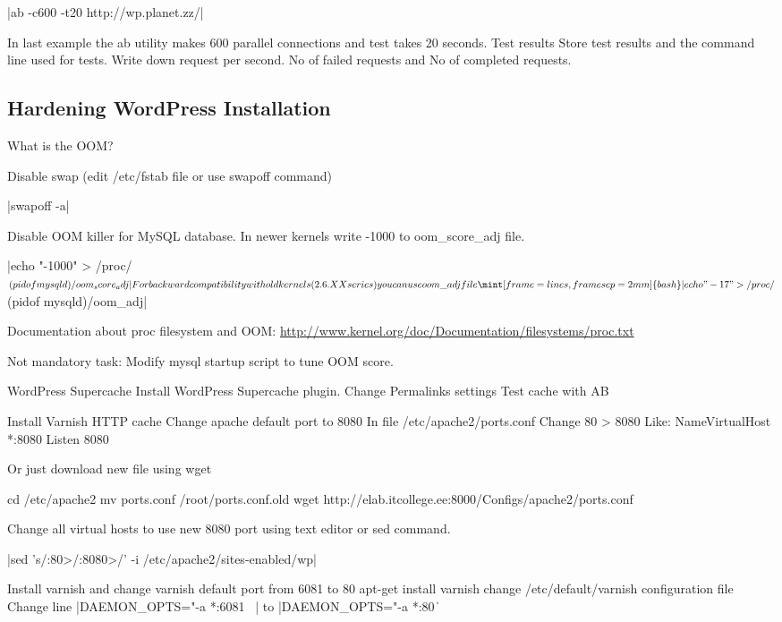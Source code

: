 |ab -c600 -t20 http://wp.planet.zz/|

In last example the ab utility makes 600 parallel connections and test takes 20 seconds.
Test results
Store test results and the command line used for tests.
Write down request per second. No of failed requests and No of completed requests.

\subsection{Hardening WordPress Installation}

What is the OOM?

Disable swap (edit /etc/fstab file or use swapoff command)


|swapoff -a|

Disable OOM killer for MySQL database. In newer kernels write -1000 to oom\_score\_adj file.

|echo "-1000" > /proc/$(pidof mysqld)/oom_score_adj|
For backward compatibility with old kernels (2.6.XX series) you can use oom\_adj file
\mint[frame=lines, framesep=2mm]{bash}|echo "-17" > /proc/$(pidof mysqld)/oom_adj|

Documentation about proc filesystem and OOM:
\url{http://www.kernel.org/doc/Documentation/filesystems/proc.txt}

Not mandatory task: Modify mysql startup script to tune OOM score. 

WordPress Supercache
Install WordPress Supercache plugin.
Change Permalinks settings
Test cache with AB

Install Varnish HTTP cache
Change apache default port to 8080
In file /etc/apache2/ports.conf
Change 80 > 8080
Like:
NameVirtualHost *:8080
Listen 8080

Or just download new file using wget 

cd /etc/apache2
mv ports.conf /root/ports.conf.old
wget http://elab.itcollege.ee:8000/Configs/apache2/ports.conf

Change all virtual hosts to use new 8080 port using text editor or sed command.

|sed 's/:80>/:8080>/' -i /etc/apache2/sites-enabled/wp|


Install varnish and change varnish default port from 6081 to 80
apt-get install varnish
change /etc/default/varnish configuration file
Change line
|DAEMON_OPTS="-a *:6081 \ |
to
|DAEMON_OPTS="-a *:80 \|


